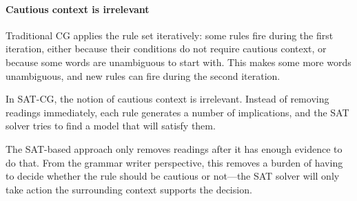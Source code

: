 



\paragraph{Cautious context is irrelevant}

Traditional CG applies the rule set iteratively:
some rules fire during the first iteration, either because their
conditions do not require cautious context, or because some words are
unambiguous to start with. This makes some more words unambiguous, and
new rules can fire during the second iteration.

In SAT-CG, the notion of cautious context is irrelevant. Instead of
removing readings immediately,  each rule generates a  number of
implications, and the SAT solver tries to find a model that will satisfy them. 

The SAT-based approach only removes readings after it has enough
evidence to do that. From the grammar writer perspective, this removes
a burden of having to decide whether the rule should be cautious or
not---the SAT solver will only take action the surrounding context
supports the decision.





